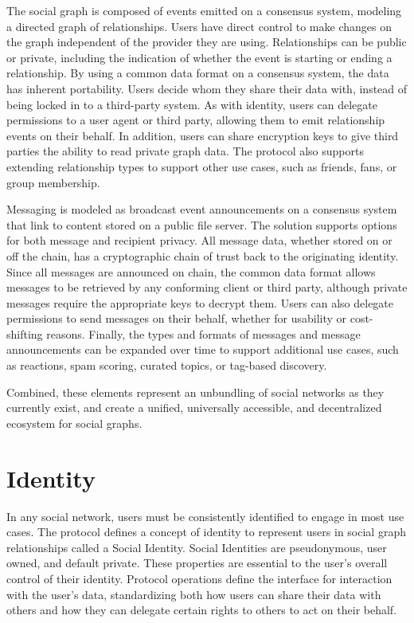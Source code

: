 \documentclass[12pt,letterpaper]{article}
\begin{document}
The social graph is composed of events emitted on a consensus system, modeling a directed
graph of  relationships. Users have direct control to make changes on the graph
independent of the provider they are using. Relationships can be public or private,
including the indication of whether the event is starting or ending a relationship. By using
a common data format on a consensus system, the data has inherent portability. Users decide
whom they share their data with, instead of being locked in to a third-party system. As with
identity, users can delegate permissions to a user agent or third party, allowing them to
emit relationship events on their behalf. In addition, users can share encryption keys to
give third parties the ability to read private graph data. The protocol also supports
extending relationship types to support other use cases, such as friends, fans, or group
membership.

Messaging is modeled as broadcast event announcements on a consensus system that link to
content stored on a public file server. The solution supports options for both message and
recipient privacy. All message data, whether stored on or off the chain, has a cryptographic
chain of trust back to the originating identity. Since all messages are announced on chain,
the common data format allows messages to be retrieved by any conforming client or third
party, although private messages require the appropriate keys to decrypt them. Users can
also delegate permissions to send messages on their behalf, whether for usability or
cost-shifting reasons. Finally, the types and formats of messages and message announcements
can be expanded over time to support additional use cases, such as reactions, spam scoring,
curated topics, or tag-based discovery.

Combined, these elements represent an unbundling of social networks as they currently
exist, and create a unified, universally accessible, and decentralized ecosystem for
social graphs.

\section{Identity}\label{sec:identity}

In any social network, users must be consistently identified to engage in most use cases.
The protocol defines a concept of identity to represent users in social graph relationships
called a Social Identity. Social Identities are pseudonymous,\cite{anon_terminology} user
owned, and default private. These properties are essential to the user's overall control of
their identity. Protocol operations define the interface for interaction with the user's
data, standardizing both how users can share their data with others and how they can
delegate certain rights to others to act on their behalf.
\end{document}
